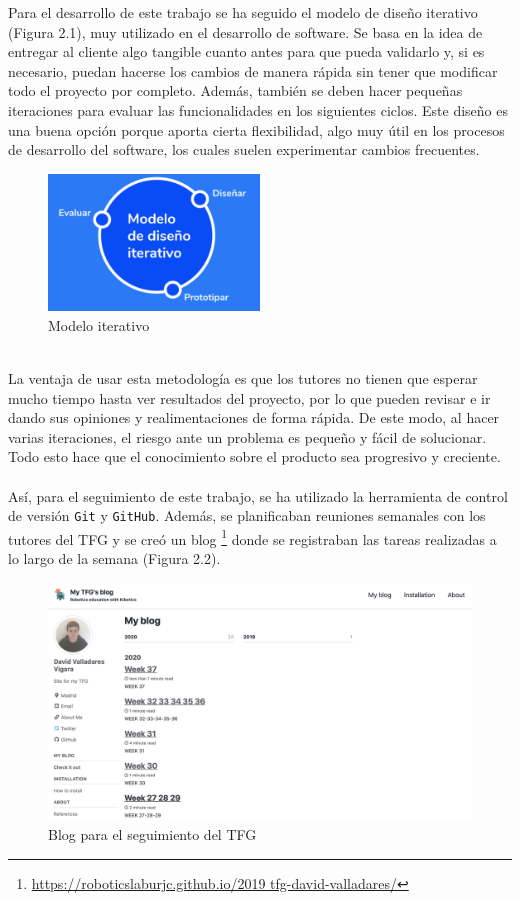 \documentclass{report}
\begin{document}
Para el desarrollo de este trabajo se ha seguido el modelo de diseño iterativo (Figura 2.1), muy utilizado en el desarrollo de software. Se basa en la idea de entregar al cliente algo tangible cuanto antes para que pueda validarlo y, si es necesario, puedan hacerse los cambios de manera rápida sin tener que modificar todo el proyecto por completo. Además, también se deben hacer pequeñas iteraciones para evaluar las funcionalidades en los siguientes ciclos. Este diseño es una buena opción porque aporta cierta flexibilidad, algo muy útil en los procesos de desarrollo del software, los cuales suelen experimentar cambios frecuentes.
\\
\begin{figure}[h!]
  \centering
    \includegraphics[width=0.5\textwidth]{images/metodologia_interativa.png}
  \caption{Modelo iterativo}
  \label{Modelo iterativo}
\end{figure}
\\
La ventaja de usar esta metodología es que los tutores no tienen que esperar mucho tiempo hasta ver resultados del proyecto, por lo que pueden revisar e ir dando sus opiniones y realimentaciones de forma rápida. De este modo, al hacer varias iteraciones, el riesgo ante un problema es pequeño y fácil de solucionar. Todo esto hace que el conocimiento sobre el producto sea progresivo y creciente.
\\
\\
Así, para el seguimiento de este trabajo, se ha utilizado la herramienta de control de versión \texttt{Git} y \texttt{GitHub}. Además, se planificaban reuniones semanales con los tutores del TFG y se creó un blog \footnote{\url{https://roboticslaburjc.github.io/2019 tfg-david-valladares/}} donde se registraban las tareas realizadas a lo largo de la semana (Figura 2.2).
\\
\begin{figure}[h!]
  \centering
    \includegraphics[width=1\textwidth]{images/blog.png}
  \caption{Blog para el seguimiento del TFG}
  \label{Blog para el seguimiento del TFG}
\end{figure}
\end{document}
